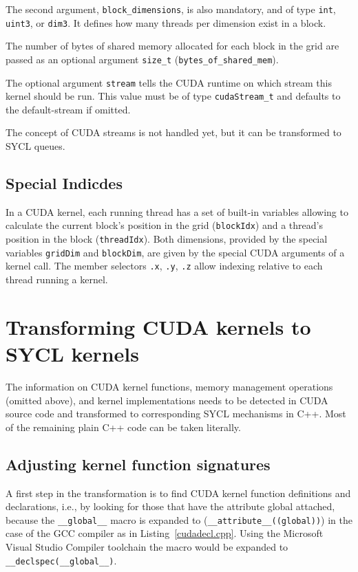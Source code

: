 \documentclass[sigconf]{acmart}
\newcommand{\inputcode}[2]{}
\newcommand{\tcode}[1]{\texttt{#1}}
\newcommand{\intt}[1]{\texttt{#1}}
\begin{document}
    The second argument, \intt{block_dimensions}, is also mandatory, and of type \intt{int}, \intt{uint3}, or \intt{dim3}. It defines how many threads per dimension exist in a block. %
    
    The number of bytes of shared memory allocated for each block in the grid are passed as an optional argument \intt{size_t} (\intt{bytes_of_shared_mem}). 
    
    The optional argument \intt{stream} tells the CUDA runtime on which stream this kernel should be run. This value must be of type \intt{cudaStream_t} and defaults to the default-stream if omitted.

    The concept of CUDA streams is not handled yet, but it can be transformed to SYCL queues.


\subsection{Special Indicdes}
In a CUDA kernel, each running thread has a set of built-in variables allowing to calculate the current block's position in the grid (\tcode{blockIdx}) and a thread's position in the block (\tcode{threadIdx}). Both dimensions, provided by the special variables \intt{gridDim} and \intt{blockDim}, are given by the special CUDA arguments of a kernel call. The member selectors \tcode{.x}, \tcode{.y}, \tcode{.z} allow indexing relative to each thread running a kernel.

\section{Transforming CUDA kernels to SYCL kernels}
The information on CUDA kernel functions, memory management operations (omitted above), and kernel implementations needs to be detected in CUDA source code and transformed to corresponding SYCL mechanisms in C++. Most of the remaining plain C++ code can be taken literally.
 
\subsection{Adjusting kernel function signatures}
A first step in the transformation is to find CUDA kernel function definitions and declarations, i.e., by looking for those that have the attribute global attached, because the \tcode{__global__} macro is expanded to (\tcode{__attribute__((global))}) in the case of the GCC compiler as in Listing~\ref{cudadecl.cpp}. Using the Microsoft Visual Studio Compiler toolchain the macro would be expanded to \tcode{__declspec(__global__)}.
\inputcode{cudadecl.cpp}{Declaring a CUDA kernel}
\end{document}
